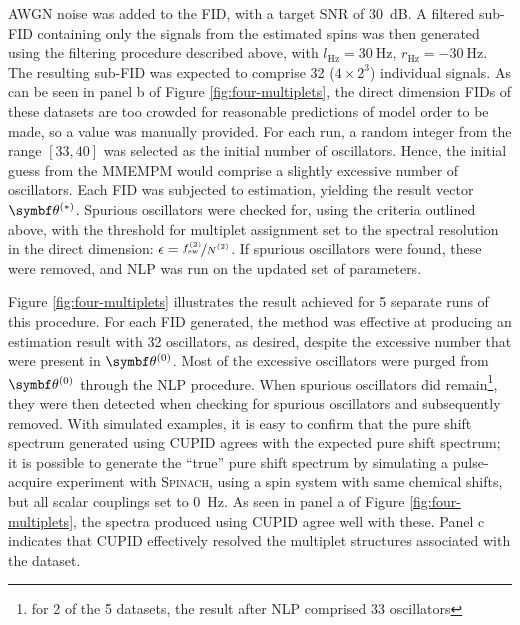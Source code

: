 \ac{AWGN} noise was added to the \ac{FID}, with a target \ac{SNR} of \qty{30}{\deci\bel}.
A filtered sub-\ac{FID} containing only the signals from the estimated spins
was then generated using the filtering procedure described above, with
$l_{\unit{\hertz}} = \qty{30}{\hertz}$,
$r_{\unit{\hertz}} = \qty{-30}{\hertz}$.
The resulting sub-\ac{FID} was expected to comprise 32 ($4 \times
2^3$) individual signals. As can be seen in panel b of Figure
\ref{fig:four-multiplets}, the direct dimension \acp{FID} of these datasets are
too crowded for reasonable predictions of model order to be made, so a value
was manually provided. For each run, a random integer from the range $[33, 40]$
was selected as the initial number of oscillators. Hence, the initial guess
from the \ac{MMEMPM} would comprise a slightly excessive number of oscillators.
Each \ac{FID} was subjected to estimation, yielding the result vector
$\bthstar$. Spurious oscillators were checked for, using the criteria outlined
above, with the threshold for multiplet assignment set to the spectral
resolution in the direct dimension: $\epsilon =
\nicefrac{f_{\text{sw}}^{(2)}}{\Ntwo}$. If spurious oscillators were found,
these were removed, and \ac{NLP} was run on the updated set of parameters.

Figure \ref{fig:four-multiplets} illustrates the result achieved for 5 separate
runs of this procedure.
For each \ac{FID} generated, the method was effective at producing an
estimation result with 32 oscillators, as desired, despite the excessive number
that were present in $\bthzero$. Most of the excessive oscillators were purged
from $\bthzero$ through the \ac{NLP} procedure. When spurious oscillators did
remain\footnote{for 2 of the 5 datasets, the result after \ac{NLP} comprised 33
oscillators}, they were then detected when checking for spurious oscillators
and subsequently removed. With simulated examples, it is easy to confirm that
the pure shift spectrum generated using \ac{CUPID} agrees with the expected
pure shift spectrum; it is possible to generate the ``true'' pure shift
spectrum by simulating a pulse-acquire experiment with \textsc{Spinach}, using
a spin system with same chemical shifts, but all scalar couplings set to
\qty{0}{\hertz}.
As seen in panel a of Figure \ref{fig:four-multiplets}, the spectra produced
using \ac{CUPID} agree well with these. Panel c indicates that \ac{CUPID}
effectively resolved the multiplet structures associated with the dataset.


